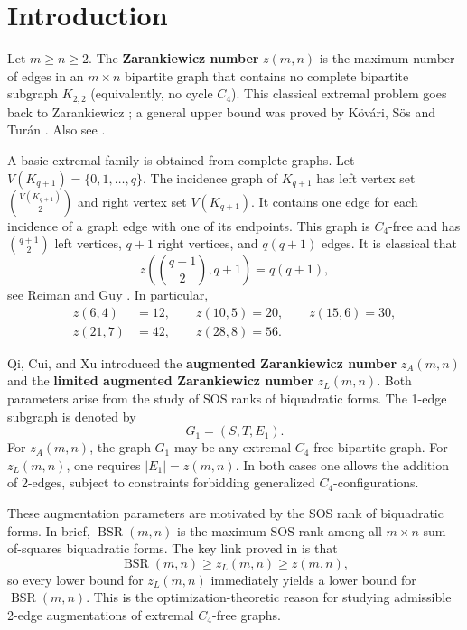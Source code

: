 \documentclass[10pt]{article}
\newcommand{\0}{\mathbf{0}}
\newcommand{\1}{\mathbf{1}}
\begin{document}
\section{Introduction}

Let \(m \ge n \ge 2\). The \textbf{Zarankiewicz number} \(z(m,n)\) is the maximum number of edges in an \(m \times n\) bipartite graph that contains no complete bipartite subgraph \(K_{2,2}\) (equivalently, no cycle \(C_4\)). This classical extremal problem goes back to Zarankiewicz \cite{Za51}; a general upper bound was proved by K\"{o}v\'{a}ri, S\"{o}s and Tur\'{a}n \cite{KST54}. Also see \cite{CHM24}.

A basic extremal family is obtained from complete graphs. Let \(V(K_{q+1})=\{0,1,\dots,q\}\). The incidence graph of \(K_{q+1}\) has left vertex set \(\binom{V(K_{q+1})}{2}\) and right vertex set \(V(K_{q+1})\). It contains one edge for each incidence of a graph edge with one of its endpoints. This graph is \(C_4\)-free and has \(\binom{q+1}{2}\) left vertices, \(q+1\) right vertices, and \(q(q+1)\) edges. It is classical that
\[
z\!\left(\binom{q+1}{2},q+1\right)=q(q+1),
\]
see Reiman \cite{Re58} and Guy \cite{Gu69}. In particular,
\[
\begin{aligned}
z(6,4)&=12,\qquad z(10,5)=20,\qquad z(15,6)=30,\\
z(21,7)&=42,\qquad z(28,8)=56.
\end{aligned}
\]

Qi, Cui, and Xu \cite{QCX26a} introduced the \textbf{augmented Zarankiewicz number} \(z_A(m,n)\) and the \textbf{limited augmented Zarankiewicz number} \(z_L(m,n)\). Both parameters arise from the study of SOS ranks of biquadratic forms. The 1-edge subgraph is denoted by
\[
G_1=(S,T,E_1).
\]
For \(z_A(m,n)\), the graph \(G_1\) may be any extremal \(C_4\)-free bipartite graph. For \(z_L(m,n)\), one requires \(|E_1|=z(m,n)\). In both cases one allows the addition of 2-edges, subject to constraints forbidding generalized \(C_4\)-configurations.

{These augmentation parameters are motivated by the SOS rank of biquadratic forms. In brief, \(\operatorname{BSR}(m,n)\) \cite{QCX26a} is the maximum SOS rank among all \(m\times n\) sum-of-squares biquadratic forms. The key link proved in \cite{QCX26a} is that}
\[
{\operatorname{BSR}(m,n) \ge z_L(m,n) \ge z(m,n),}
\]
{so every lower bound for \(z_L(m,n)\) immediately yields a lower bound for \(\operatorname{BSR}(m,n)\). This is the optimization-theoretic reason for studying admissible 2-edge augmentations of extremal \(C_4\)-free graphs.}
\end{document}
